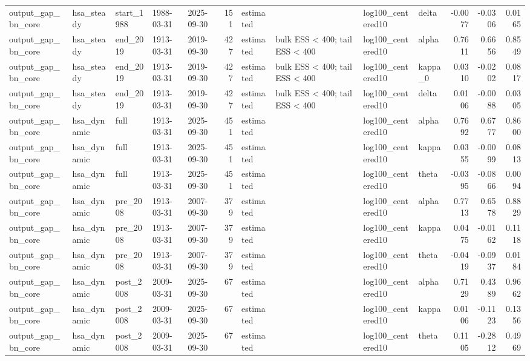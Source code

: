 \begin{tabular}{lllllrllllrrr}
output\_gap\_bn\_core & hsa\_steady & start\_1988 & 1988-03-31 & 2025-09-30 & 151 & estimated &  & log100\_centered10 & delta & -0.0077 & -0.0306 & 0.0165 \\
output\_gap\_bn\_core & hsa\_steady & end\_2019 & 1913-03-31 & 2019-09-30 & 427 & estimated & bulk ESS < 400; tail ESS < 400 & log100\_centered10 & alpha & 0.7611 & 0.6656 & 0.8549 \\
output\_gap\_bn\_core & hsa\_steady & end\_2019 & 1913-03-31 & 2019-09-30 & 427 & estimated & bulk ESS < 400; tail ESS < 400 & log100\_centered10 & kappa\_0 & 0.0310 & -0.0202 & 0.0817 \\
output\_gap\_bn\_core & hsa\_steady & end\_2019 & 1913-03-31 & 2019-09-30 & 427 & estimated & bulk ESS < 400; tail ESS < 400 & log100\_centered10 & delta & 0.0106 & -0.0088 & 0.0305 \\
output\_gap\_bn\_core & hsa\_dynamic & full & 1913-03-31 & 2025-09-30 & 451 & estimated &  & log100\_centered10 & alpha & 0.7692 & 0.6777 & 0.8600 \\
output\_gap\_bn\_core & hsa\_dynamic & full & 1913-03-31 & 2025-09-30 & 451 & estimated &  & log100\_centered10 & kappa & 0.0355 & -0.0099 & 0.0813 \\
output\_gap\_bn\_core & hsa\_dynamic & full & 1913-03-31 & 2025-09-30 & 451 & estimated &  & log100\_centered10 & theta & -0.0395 & -0.0866 & 0.0094 \\
output\_gap\_bn\_core & hsa\_dynamic & pre\_2008 & 1913-03-31 & 2007-09-30 & 379 & estimated &  & log100\_centered10 & alpha & 0.7713 & 0.6578 & 0.8829 \\
output\_gap\_bn\_core & hsa\_dynamic & pre\_2008 & 1913-03-31 & 2007-09-30 & 379 & estimated &  & log100\_centered10 & kappa & 0.0475 & -0.0162 & 0.1118 \\
output\_gap\_bn\_core & hsa\_dynamic & pre\_2008 & 1913-03-31 & 2007-09-30 & 379 & estimated &  & log100\_centered10 & theta & -0.0419 & -0.0937 & 0.0184 \\
output\_gap\_bn\_core & hsa\_dynamic & post\_2008 & 2009-03-31 & 2025-09-30 & 67 & estimated &  & log100\_centered10 & alpha & 0.7129 & 0.4389 & 0.9662 \\
output\_gap\_bn\_core & hsa\_dynamic & post\_2008 & 2009-03-31 & 2025-09-30 & 67 & estimated &  & log100\_centered10 & kappa & 0.0106 & -0.1123 & 0.1356 \\
output\_gap\_bn\_core & hsa\_dynamic & post\_2008 & 2009-03-31 & 2025-09-30 & 67 & estimated &  & log100\_centered10 & theta & 0.1105 & -0.2812 & 0.4969 \\

\end{tabular}
